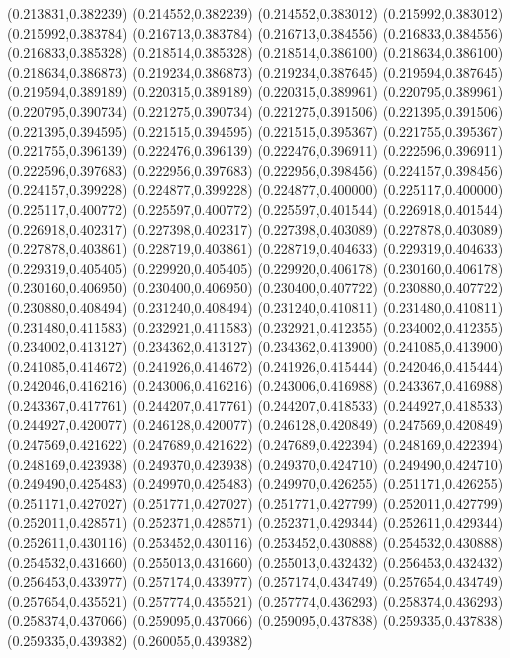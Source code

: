 (0.213831,0.382239)
(0.214552,0.382239)
(0.214552,0.383012)
(0.215992,0.383012)
(0.215992,0.383784)
(0.216713,0.383784)
(0.216713,0.384556)
(0.216833,0.384556)
(0.216833,0.385328)
(0.218514,0.385328)
(0.218514,0.386100)
(0.218634,0.386100)
(0.218634,0.386873)
(0.219234,0.386873)
(0.219234,0.387645)
(0.219594,0.387645)
(0.219594,0.389189)
(0.220315,0.389189)
(0.220315,0.389961)
(0.220795,0.389961)
(0.220795,0.390734)
(0.221275,0.390734)
(0.221275,0.391506)
(0.221395,0.391506)
(0.221395,0.394595)
(0.221515,0.394595)
(0.221515,0.395367)
(0.221755,0.395367)
(0.221755,0.396139)
(0.222476,0.396139)
(0.222476,0.396911)
(0.222596,0.396911)
(0.222596,0.397683)
(0.222956,0.397683)
(0.222956,0.398456)
(0.224157,0.398456)
(0.224157,0.399228)
(0.224877,0.399228)
(0.224877,0.400000)
(0.225117,0.400000)
(0.225117,0.400772)
(0.225597,0.400772)
(0.225597,0.401544)
(0.226918,0.401544)
(0.226918,0.402317)
(0.227398,0.402317)
(0.227398,0.403089)
(0.227878,0.403089)
(0.227878,0.403861)
(0.228719,0.403861)
(0.228719,0.404633)
(0.229319,0.404633)
(0.229319,0.405405)
(0.229920,0.405405)
(0.229920,0.406178)
(0.230160,0.406178)
(0.230160,0.406950)
(0.230400,0.406950)
(0.230400,0.407722)
(0.230880,0.407722)
(0.230880,0.408494)
(0.231240,0.408494)
(0.231240,0.410811)
(0.231480,0.410811)
(0.231480,0.411583)
(0.232921,0.411583)
(0.232921,0.412355)
(0.234002,0.412355)
(0.234002,0.413127)
(0.234362,0.413127)
(0.234362,0.413900)
(0.241085,0.413900)
(0.241085,0.414672)
(0.241926,0.414672)
(0.241926,0.415444)
(0.242046,0.415444)
(0.242046,0.416216)
(0.243006,0.416216)
(0.243006,0.416988)
(0.243367,0.416988)
(0.243367,0.417761)
(0.244207,0.417761)
(0.244207,0.418533)
(0.244927,0.418533)
(0.244927,0.420077)
(0.246128,0.420077)
(0.246128,0.420849)
(0.247569,0.420849)
(0.247569,0.421622)
(0.247689,0.421622)
(0.247689,0.422394)
(0.248169,0.422394)
(0.248169,0.423938)
(0.249370,0.423938)
(0.249370,0.424710)
(0.249490,0.424710)
(0.249490,0.425483)
(0.249970,0.425483)
(0.249970,0.426255)
(0.251171,0.426255)
(0.251171,0.427027)
(0.251771,0.427027)
(0.251771,0.427799)
(0.252011,0.427799)
(0.252011,0.428571)
(0.252371,0.428571)
(0.252371,0.429344)
(0.252611,0.429344)
(0.252611,0.430116)
(0.253452,0.430116)
(0.253452,0.430888)
(0.254532,0.430888)
(0.254532,0.431660)
(0.255013,0.431660)
(0.255013,0.432432)
(0.256453,0.432432)
(0.256453,0.433977)
(0.257174,0.433977)
(0.257174,0.434749)
(0.257654,0.434749)
(0.257654,0.435521)
(0.257774,0.435521)
(0.257774,0.436293)
(0.258374,0.436293)
(0.258374,0.437066)
(0.259095,0.437066)
(0.259095,0.437838)
(0.259335,0.437838)
(0.259335,0.439382)
(0.260055,0.439382)
